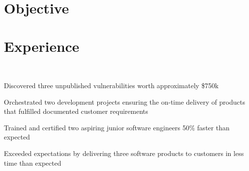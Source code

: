 \documentclass[]{resume}
\begin{document}
\begin{minipage}[t]{0.69\textwidth}

\section{Objective}

\sectionsep

\section{Experience}

 \\
\vspace{\topsep} %
\begin{tightemize}
\item Discovered three unpublished vulnerabilities worth approximately \$750k
\item Orchestrated two development projects ensuring the on-time delivery of products that fulfilled documented customer requirements 
\item Trained and certified two aspiring junior software engineers 50\% faster than expected
\item Exceeded expectations by delivering three software products to customers in less time than expected
\end{tightemize}

\sectionsep


\end{minipage}
\end{document}
